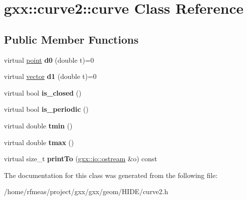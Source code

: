 \hypertarget{classgxx_1_1curve2_1_1curve}{}\section{gxx\+:\+:curve2\+:\+:curve Class Reference}
\label{classgxx_1_1curve2_1_1curve}
\subsection*{Public Member Functions}
\begin{DoxyCompactItemize}
\item 
virtual \hyperlink{classmalgo_1_1vector2}{point} {\bfseries d0} (double t)=0\hypertarget{classgxx_1_1curve2_1_1curve_a9292d9f5a865812af902e2919f897498}{}\label{classgxx_1_1curve2_1_1curve_a9292d9f5a865812af902e2919f897498}

\item 
virtual \hyperlink{classmalgo_1_1vector2}{vector} {\bfseries d1} (double t)=0\hypertarget{classgxx_1_1curve2_1_1curve_a9e61f66c6d9fa0f3a2eef1bfae71f7c4}{}\label{classgxx_1_1curve2_1_1curve_a9e61f66c6d9fa0f3a2eef1bfae71f7c4}

\item 
virtual bool {\bfseries is\+\_\+closed} ()\hypertarget{classgxx_1_1curve2_1_1curve_a7d71fd12bda93d336846c87c4540015a}{}\label{classgxx_1_1curve2_1_1curve_a7d71fd12bda93d336846c87c4540015a}

\item 
virtual bool {\bfseries is\+\_\+periodic} ()\hypertarget{classgxx_1_1curve2_1_1curve_a71fd5539e811cddcebbe0ef233be33c6}{}\label{classgxx_1_1curve2_1_1curve_a71fd5539e811cddcebbe0ef233be33c6}

\item 
virtual double {\bfseries tmin} ()\hypertarget{classgxx_1_1curve2_1_1curve_a420e8364956a115c6523b35b7ab96213}{}\label{classgxx_1_1curve2_1_1curve_a420e8364956a115c6523b35b7ab96213}

\item 
virtual double {\bfseries tmax} ()\hypertarget{classgxx_1_1curve2_1_1curve_a3f78799e64c71ec4c86cb1bec8943f88}{}\label{classgxx_1_1curve2_1_1curve_a3f78799e64c71ec4c86cb1bec8943f88}

\item 
virtual size\+\_\+t {\bfseries print\+To} (\hyperlink{classgxx_1_1io_1_1ostream}{gxx\+::io\+::ostream} \&o) const \hypertarget{classgxx_1_1curve2_1_1curve_a79a3202da23c99f6f69426039bf1acd9}{}\label{classgxx_1_1curve2_1_1curve_a79a3202da23c99f6f69426039bf1acd9}

\end{DoxyCompactItemize}


The documentation for this class was generated from the following file\+:\begin{DoxyCompactItemize}
\item 
/home/rfmeas/project/gxx/gxx/geom/\+H\+I\+D\+E/curve2.\+h\end{DoxyCompactItemize}
